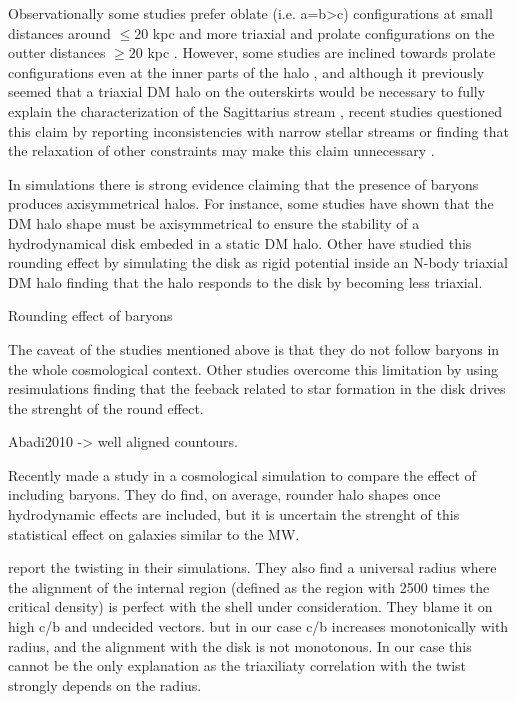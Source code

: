 \documentclass[a4paper,fleqn,usenatbib]{mnras}
\begin{document}
\citep{Dubinski91}


Observationally some studies prefer oblate (i.e. a=b>c) configurations at small
distances around $\leq 20$ kpc
\citep[see][]{Law_and_Majewski_2010,Bovy_et_el._2016,Loebman_et_al._2012,Olling_and_Merrifield_2000,Banerjee_and_Chanda_2011} 
and more triaxial and prolate configurations on the outter distances
$\geq 20$ kpc 
\citep[see][]{Vera-Ciro_and_Helmi_2013,Law_and_Majewski_2009,Deg_and_Widrow_2013,Banerjee_and_Chanda_2011}.
However, some  studies are inclined towards prolate configurations even at the inner
parts of the halo \citep[see][]{Bowden_et_al._2016}, and
although it previously seemed that a triaxial DM halo on the
outerskirts would be necessary to fully explain the characterization
of the Sagittarius stream \citep{Law_and_Majewski_2009}, recent studies
questioned this claim by reporting inconsistencies with narrow stellar
streams \citet{Pearson_et_al._2015} or finding that
the relaxation of other constraints may make this claim unnecessary
\citet{Ibata_et_al._2013}. 

In simulations there is strong evidence claiming that the presence of
baryons produces axisymmetrical halos.  
For instance, some studies have shown that the DM halo shape must be
axisymmetrical to ensure the stability of a hydrodynamical disk
embeded in a static DM halo. 
Other have studied this rounding effect by simulating the disk as rigid
potential inside an N-body triaxial DM
halo \cite{Debattista_et_al._2008,Debattista_et_al._2013,Kazantzidis_et_al._2010}
finding that the halo responds to the disk by becoming less triaxial. 

Rounding effect of baryons
\citep{Dubinski94}

The caveat of the studies mentioned above is that they do not
follow baryons in the whole cosmological context. 
Other studies overcome this limitation by using resimulations 
\citep{Abadi_et_al._2010,Bryan_et_al._2013} finding that the
feeback related to star formation in the disk drives the strenght of
the round effect. 

Abadi2010 -> well aligned countours.

Recently \cite{2018arXiv180907255C} made a study in a cosmological
simulation to compare the effect of including baryons. They do find,
on average, rounder halo shapes once hydrodynamic effects are
included, but it is uncertain the strenght of this statistical effect
on galaxies similar to the MW.


\citep{JingSuto02} report the twisting in their simulations.
They also find a universal radius where the alignment of the internal 
region (defined as the region with 2500 times the critical density) 
is perfect with the shell under consideration.
They blame it on high c/b and undecided vectors.
but in our case c/b increases monotonically with radius, and the
alignment with the disk is not monotonous. In our case this cannot be
the only explanation as the triaxiliaty correlation with the twist 
strongly depends on the radius.
\end{document}
